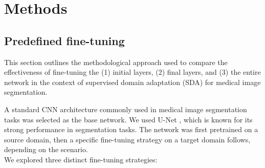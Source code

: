 \section{Methods}


\subsection{Predefined fine-tuning}
\label{sec:mri:method:sft}

This section outlines the methodological approach used to compare the effectiveness of fine-tuning the (1) initial layers, (2) final layers, and (3) the entire network in the context of supervised domain adaptation (SDA) for medical image segmentation.

A standard CNN architecture commonly used in medical image segmentation tasks was selected as the base network. We used U-Net \cite{ronneberger2015u}, which is known for its strong performance in segmentation tasks. The network was first pretrained on a source domain, then a specific fine-tuning strategy on a target domain follows, depending on the scenario.\\

We explored three distinct fine-tuning strategies:

